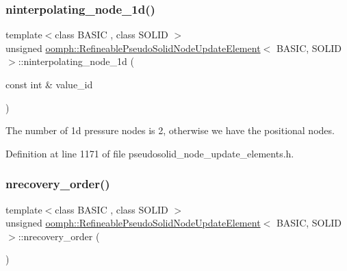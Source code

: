 \subsubsection{\texorpdfstring{ninterpolating\+\_\+node\+\_\+1d()}{ninterpolating\_node\_1d()}}
{\footnotesize\ttfamily template$<$class B\+A\+S\+IC , class S\+O\+L\+ID $>$ \\
unsigned \hyperlink{classoomph_1_1RefineablePseudoSolidNodeUpdateElement}{oomph\+::\+Refineable\+Pseudo\+Solid\+Node\+Update\+Element}$<$ B\+A\+S\+IC, S\+O\+L\+ID $>$\+::ninterpolating\+\_\+node\+\_\+1d (\begin{DoxyParamCaption}\item[{const int \&}]{value\+\_\+id }\end{DoxyParamCaption})\hspace{0.3cm}{\ttfamily [inline]}}



The number of 1d pressure nodes is 2, otherwise we have the positional nodes. 



Definition at line 1171 of file pseudosolid\+\_\+node\+\_\+update\+\_\+elements.\+h.

\mbox{\label{classoomph_1_1RefineablePseudoSolidNodeUpdateElement_a3947be55246e7cbaa127057db8881858}} 
\subsubsection{\texorpdfstring{nrecovery\+\_\+order()}{nrecovery\_order()}}
{\footnotesize\ttfamily template$<$class B\+A\+S\+IC , class S\+O\+L\+ID $>$ \\
unsigned \hyperlink{classoomph_1_1RefineablePseudoSolidNodeUpdateElement}{oomph\+::\+Refineable\+Pseudo\+Solid\+Node\+Update\+Element}$<$ B\+A\+S\+IC, S\+O\+L\+ID $>$\+::nrecovery\+\_\+order (\begin{DoxyParamCaption}{ }\end{DoxyParamCaption})\hspace{0.3cm}{\ttfamily [inline]}}




